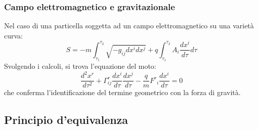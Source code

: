 \subsubsection{Campo elettromagnetico e gravitazionale}

Nel caso di una particella soggetta ad un campo elettromagnetico su una varietà curva:
\begin{equation}
	S = -m \int_{\tau_1}^{\tau_2} \sqrt{- g_{ij} dx^i dx^j} + q \int_{\tau_1}^{\tau_2} A_i \frac{dx^i}{d\tau} d\tau
	\label{eq:5.13}
\end{equation}
Svolgendo i calcoli, si trova l'equazione del moto:
\begin{equation}
	\frac{d^2 x^r}{d\tau^2} + \Gamma^r_{ij} \frac{dx^i}{d\tau} \frac{dx^j}{d\tau} - \frac{q}{m} F^r_{\,\,\,i} \frac{dx^i}{d\tau} = 0
	\label{eq:5.14}
\end{equation}
che conferma l'identificazione del termine geometrico con la forza di gravità.

\subsection{Principio d'equivalenza}

